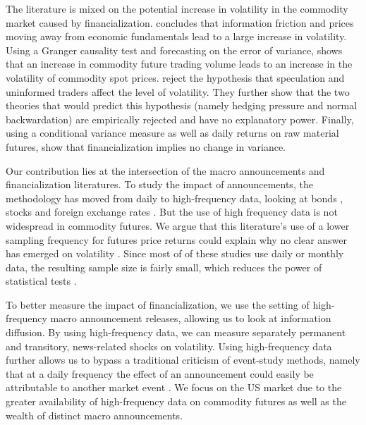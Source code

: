 \documentclass[12pt]{article}
\begin{document}
The literature is mixed on the potential increase in volatility in the commodity market caused by financialization. \citet{singleton2014investor} concludes that information friction and prices moving away from economic fundamentals lead to a large increase in volatility. Using a Granger causality test and forecasting on the error of variance, \citet{yang2005futures} shows that an increase in commodity future trading volume leads to an increase in the volatility of commodity spot prices. \citet{bryant2006causality} reject the hypothesis that speculation and uninformed traders affect the level of volatility. They further show that the two theories that would predict this hypothesis (namely hedging pressure and normal backwardation) are empirically rejected and have no explanatory power. Finally, using a conditional variance measure as well as daily returns on raw material futures, \citet{bohl2013does} show that financialization implies no change in variance.


Our contribution lies at the intersection of the macro announcements and financialization literatures. To study the impact of announcements, the methodology has moved from daily to high-frequency data, looking at  bonds  \citep{andersen2007real, hu2013noise, balduzzi2001economic,lee1995oil, hautsch2011impact, kurov2019price}, stocks \citep{andersen2007real,bernile2016can,kurov2019price} and foreign exchange rates \citep{lee1995oil,andersen2003micro}. But the use of high frequency data is not widespread in commodity futures. We argue that this literature's use of a lower sampling frequency for futures price returns could explain why no clear answer has emerged on volatility \citep{tang2012index,brunetti2016speculators,irwin2012testing,stoll2010commodity,alquist2013role}. Since most of of these studies use daily or monthly data, the resulting sample size is fairly small, which reduces the power of statistical tests \citep{irwin2009devil}.  

To better measure the impact of financialization, we use the setting of high-frequency macro announcement releases, allowing us to look at information diffusion. By using high-frequency data, we can measure separately permanent and transitory, news-related shocks on volatility.
Using high-frequency data further allows us to bypass a traditional criticism of event-study methods, namely that at a daily frequency the effect of an announcement could easily be attributable to another market event \citep{kothari2007econometrics}. We focus on the US market due to the greater availability of high-frequency data on commodity futures as well as the wealth of distinct macro announcements.
\end{document}
